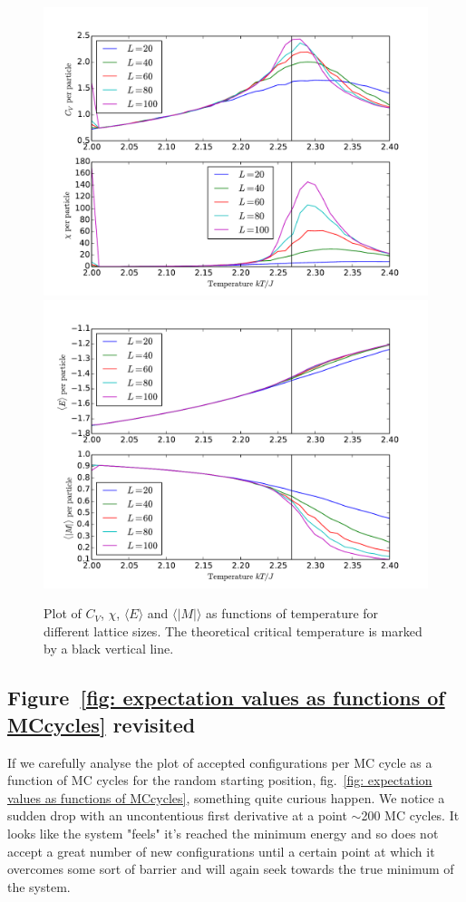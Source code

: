 \documentclass[twoside, 11pt]{article}
\begin{document}
			\begin{figure}
				\centering
				\includegraphics[scale=0.7, clip=true, trim=0 12 0 0]{../Results/task_e/task_e_chi_VS_time_1000000.pdf}
				\includegraphics[scale=0.7, clip=true, trim=0 0 0 25]{../Results/task_e/task_e_absMaverage_VS_time_1000000.pdf}
				\caption{Plot of $C_V$, $\chi$, $\langle E \rangle$ and $\langle |M| \rangle$ as functions of temperature for different lattice sizes. The theoretical critical temperature is marked by a black vertical line.}
				\label{fig: different lattice sizes}
			\end{figure}
		
		\subsection{Figure~\ref{fig: expectation values as functions of MCcycles} revisited}
			If we carefully analyse the plot of accepted configurations per MC cycle as a function of MC cycles for the random starting position, fig.~\ref{fig: expectation values as functions of MCcycles}, something quite curious happen. We notice a sudden drop  with an uncontentious first derivative at a point $\sim$200 MC cycles. It looks like the system "feels" it's reached the minimum energy and so does not accept a great number of new configurations until a certain point at which it overcomes some sort of barrier and will again seek towards the true minimum of the system. 
			
\end{document}
